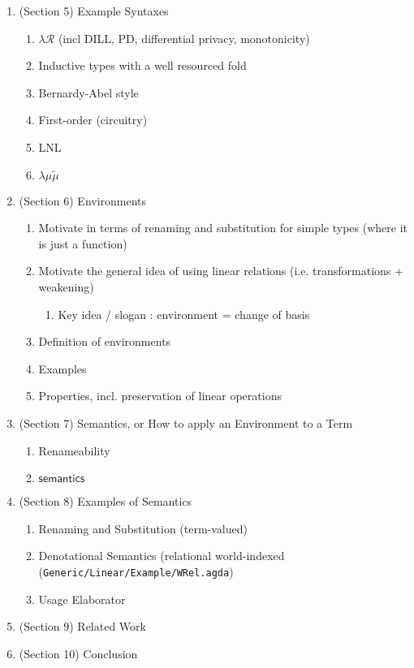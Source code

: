 \documentclass[runningheads]{llncs}
\begin{document}
\begin{enumerate}
\begin{enumerate}
  \end{enumerate}
\item (Section 5) Example Syntaxes
  \begin{enumerate}
  \item $\lambda\mathcal{R}$ (incl DILL, PD, differential privacy, monotonicity)
  \item Inductive types with a well resourced fold
  \item Bernardy-Abel style
  \item First-order (circuitry)
  \item LNL
  \item $\lambda\mu\tilde{\mu}$
  \end{enumerate}
\item (Section 6) Environments
  \begin{enumerate}
  \item Motivate in terms of renaming and substitution for simple types (where it is just a function)
  \item Motivate the general idea of using linear relations (i.e. transformations + weakening)
    \begin{enumerate}
    \item Key idea / slogan : environment = change of basis
    \end{enumerate}
  \item Definition of environments
  \item Examples
  \item Properties, incl. preservation of linear operations
  \end{enumerate}
\item (Section 7) Semantics, or How to apply an Environment to a Term
  \begin{enumerate}
  \item Renameability
  \item $\mathsf{semantics}$
  \end{enumerate}
\item (Section 8) Examples of Semantics
  \begin{enumerate}
  \item Renaming and Substitution (term-valued)
  \item Denotational Semantics (relational world-indexed (\texttt{Generic/Linear/Example/WRel.agda})
  \item Usage Elaborator
  \end{enumerate}
\item (Section 9) Related Work
\item (Section 10) Conclusion
\end{enumerate}
\end{document}
